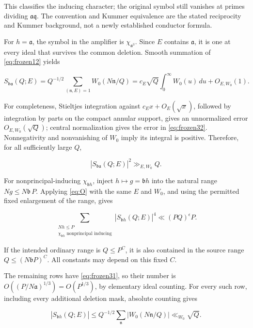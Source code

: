 \documentclass[11pt]{article}
\theoremstyle{remark}\newtheorem{remark}[theorem]{Remark}
\begin{document}
This classifies the inducing character; the original symbol still vanishes at primes dividing \(\mathfrak a\mathfrak q\). The convention and Kummer equivalence are the stated reciprocity and Kummer background, not a newly established conductor formula.

For \(h=\mathfrak a\), the symbol in the amplifier is \(\chi_{\mathfrak a^3}\). Since \(E\) contains \(\mathfrak a\), it is one at every ideal that survives the common deletion. Smooth summation of \eqref{eq:frozen12} yields

\begin{equation}
S_{\mathfrak b\mathfrak a}(Q;E)
=Q^{-1/2}\sum_{(\mathfrak n,E)=1}W_0(N\mathfrak n/Q)
=c_E\sqrt Q\int_0^\infty W_0(u)\,du+O_{E,W_0}(1).
\label{eq:frozen32}
\end{equation}

For completeness, Stieltjes integration against \(c_Ex+O_E(\sqrt x)\), followed by integration by parts on the compact annular support, gives an unnormalized error \(O_{E,W_0}(\sqrt Q)\); central normalization gives the error in \eqref{eq:frozen32}. Nonnegativity and nonvanishing of \(W_0\) imply its integral is positive. Therefore, for all sufficiently large \(Q\),

\begin{equation}
|S_{\mathfrak b\mathfrak a}(Q;E)|^2\gg_{E,W_0}Q.
\label{eq:frozen33}
\end{equation}

For nonprincipal-inducing \(\chi_{\mathfrak b h}\), inject \(h\mapsto g=\mathfrak b h\) into the natural range \(Ng\le N\mathfrak b\,P\). Applying \eqref{eq:O} with the same \(E\) and \(W_0\), and using the permitted fixed enlargement of the range, gives

\begin{equation}
\sum_{\substack{Nh\le P\\\chi_{\mathfrak b h}\text{ nonprincipal inducing}}}
|S_{\mathfrak b h}(Q;E)|^4\ll(PQ)^\epsilon P.
\label{eq:frozen34}
\end{equation}

If the intended ordinary range is \(Q\le P^C\), it is also contained in the source range \(Q\le(N\mathfrak b P)^C\). All constants may depend on this fixed \(C\).

The remaining rows have \eqref{eq:frozen31}, so their number is \(O((P/N\mathfrak a)^{1/3})=O(P^{1/3})\), by elementary ideal counting. For every such row, including every additional deletion mask, absolute counting gives

\[
|S_{\mathfrak b h}(Q;E)|\le Q^{-1/2}\sum_{\mathfrak n}|W_0(N\mathfrak n/Q)|\ll_{W_0}\sqrt Q.
\]
\end{document}
